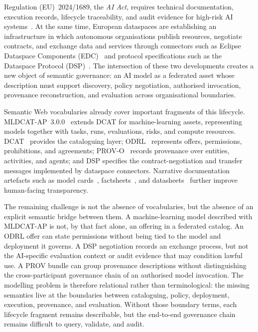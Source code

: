 \documentclass[11pt,a4paper]{article}
\begin{document}
Regulation (EU)~2024/1689, the \emph{AI Act}, requires technical documentation, execution records, lifecycle traceability, and audit evidence for high-risk AI systems~\cite{aiact}. At the same time, European dataspaces are establishing an infrastructure in which autonomous organisations publish resources, negotiate contracts, and exchange data and services through connectors such as Eclipse Dataspace Components (EDC)~\cite{edc} and protocol specifications such as the Dataspace Protocol (DSP)~\cite{dsp}. The intersection of these two developments creates a new object of semantic governance: an AI model as a federated asset whose description must support discovery, policy negotiation, authorised invocation, provenance reconstruction, and evaluation across organisational boundaries.

Semantic Web vocabularies already cover important fragments of this lifecycle. MLDCAT-AP~3.0.0~\cite{mldcatap} extends DCAT for machine-learning assets, representing models together with tasks, runs, evaluations, risks, and compute resources. DCAT~\cite{dcat2} provides the cataloguing layer; ODRL~\cite{odrl22} represents offers, permissions, prohibitions, and agreements; PROV-O~\cite{provo} records provenance over entities, activities, and agents; and DSP specifies the contract-negotiation and transfer messages implemented by dataspace connectors. Narrative documentation artefacts such as model cards~\cite{mitchell19}, factsheets~\cite{arnold19}, and datasheets~\cite{gebru21} further improve human-facing transparency.

The remaining challenge is not the absence of vocabularies, but the absence of an explicit semantic bridge between them. A machine-learning model described with MLDCAT-AP is not, by that fact alone, an offering in a federated catalog. An ODRL offer can state permissions without being tied to the model and deployment it governs. A DSP negotiation records an exchange process, but not the AI-specific evaluation context or audit evidence that may condition lawful use. A PROV bundle can group provenance descriptions without distinguishing the cross-participant governance chain of an authorised model invocation. The modelling problem is therefore relational rather than terminological: the missing semantics live at the boundaries between cataloguing, policy, deployment, execution, provenance, and evaluation. Without those boundary terms, each lifecycle fragment remains describable, but the end-to-end governance chain remains difficult to query, validate, and audit.
\end{document}
